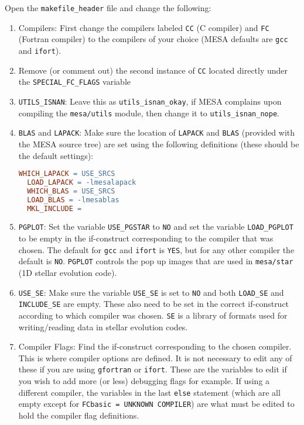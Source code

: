 Open the {\tt makefile\_header} file and change the following:
\begin{enumerate}
\item Compilers: First change the compilers labeled {\tt CC} (C compiler) 
and {\tt FC} (Fortran compiler) to the compilers of your choice ({\sf MESA} 
defaults are {\tt gcc} and {\tt ifort}).

\item Remove (or comment out) the second instance of {\tt CC} located 
directly under the {\tt SPECIAL\_FC\_FLAGS} variable

\item {\tt UTILS\_ISNAN}: Leave this as {\tt utils\_isnan\_okay}, if {\sf MESA} 
complains upon compiling the {\tt mesa/utils} module, then change it to 
{\tt utils\_isnan\_nope}.

\item {\tt BLAS} and {\tt LAPACK}: Make sure the location of {\tt LAPACK} and 
{\tt BLAS} (provided with the {\sf MESA} source tree) are set using the 
following definitions (these should be the default settings):
\begin{lstlisting}[language=make,mathescape=false]%,upquote=true]
  WHICH_LAPACK = USE_SRCS
  LOAD_LAPACK = -lmesalapack
  WHICH_BLAS = USE_SRCS
  LOAD_BLAS = -lmesablas
  MKL_INCLUDE =
\end{lstlisting}

\item {\tt PGPLOT}: Set the variable {\tt USE\_PGSTAR} to {\tt NO} and set 
the variable {\tt LOAD\_PGPLOT} to be empty in the if-construct corresponding 
to the compiler that was chosen. The default for {\tt gcc} and {\tt ifort} is 
{\tt YES}, but for any other compiler the default is {\tt NO}. {\tt PGPLOT} 
controls the pop up images that are used in {\tt mesa/star} (1D stellar 
evolution code). 

\item {\tt USE\_SE}: Make sure the variable {\tt USE\_SE} is set to {\tt NO} 
and both {\tt LOAD\_SE} and {\tt INCLUDE\_SE} are empty. These also need to 
be set in the correct if-construct according to which compiler was chosen. 
{\tt SE} is a library of 
formats used for writing/reading data in stellar evolution codes.

\item Compiler Flags: Find the if-construct corresponding to the chosen 
compiler. This is where compiler options are defined. It is not necessary to 
edit any of these if you are using {\tt gfortran} or {\tt ifort}. These are 
the variables to edit if you wish to add more (or less) debugging flags 
for example. If using a different compiler, the variables in the last 
{\tt else} statement (which are all empty except for 
{\tt FCbasic = UNKNOWN COMPILER}) are what must be edited to hold the compiler 
flag definitions. 


\end{enumerate}
